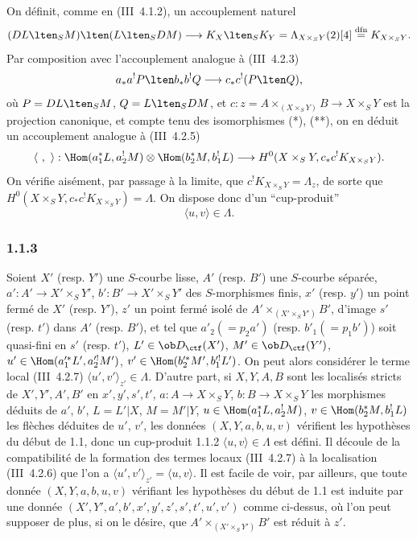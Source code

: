 On définit, comme en (III~4.1.2), un accouplement naturel
\[
(DL\lten_SM)\lten(L\lten_SDM)
\longrightarrow K_X\lten_SK_Y=\Lambda_{X\times_S Y}(2)[4]\stackrel{\mathrm{dfn}}{=}K_{X\times_S Y}.
\]
Par composition avec l'accouplement analogue à (III~4.2.3)
\[
a_*a^!P\lten b_*b^!Q\longrightarrow c_*c^!(P\lten Q),
\]
où $P=DL\lten_SM$, $Q=L\lten_SDM$, et $c:z=A\times_{(X\times_S Y)}B\to X\times_S Y$ est la projection canonique, et compte tenu des isomorphismes (*), (**), on en déduit un accouplement analogue à (III~4.2.5)
\[
\langle\ ,\ \rangle:\Hom(a_1^*L,a_2^!M)\otimes\Hom(b_2^*M,b_1^!L)
\longrightarrow H^0(X\times_S Y,c_*c^!K_{X\times_S Y}).
\]
On vérifie
aisément, par passage à la limite, que $c^!K_{X\times_S Y}=\Lambda_z$, de sorte que $H^0(X\times_S Y,c_*c^!K_{X\times_S Y})=\Lambda$. On dispose donc d'un ``cup-produit''
\begin{equation}\tag{1.1.2}
\langle u,v\rangle\in\Lambda.
\end{equation}

\subsubsection*{1.1.3}
Soient $X'$ (resp. $Y'$) une $S$-courbe lisse, $A'$ (resp. $B'$) une $S$-courbe séparée, $a':A'\longrightarrow X'\times_S Y'$, $b':B'\longrightarrow X'\times_S Y'$ des $S$-morphismes finis, $x'$ (resp. $y'$) un point fermé de $X'$ (resp. $Y'$), $z'$ un point fermé isolé de $A'\times_{(X'\times_S Y')}B'$, d'image $s'$ (resp. $t'$) dans $A'$ (resp. $B'$), et tel que $a'_2(=p_2a')$ (resp. $b'_1(=p_1b')$) soit quasi-fini en $s'$ (resp. $t'$), $L'\in\ob D_{\ctf}(X')$, $M'\in\ob D_{\ctf}(Y')$, $u'\in\Hom(a_1'^*L',a_2'^!M')$, $v'\in\Hom(b_2'^*M',b_1'^!L')$. On peut alors considérer le terme local (III~4.2.7) $\langle u',v'\rangle_{z'}\in\Lambda$. D'autre part, si $X,Y,A,B$ sont les localisés stricts de $X',Y',A',B'$ en $x',y',s',t'$, $a:A\to X\times_S Y$, $b:B\to X\times_SY$ les morphismes déduits de $a'$, $b'$, $L=L'|X$, $M=M'|Y$, $u\in\Hom(a_1^*L,a_2^!M)$, $v\in\Hom(b_2^*M,b_1^!L)$ les flèches déduites de $u'$, $v'$, les données $(X,Y,a,b,u,v)$ vérifient les hypothèses du début de 1.1, donc un cup-produit 1.1.2 $\langle u,v\rangle\in\Lambda$ est défini. Il découle de la compatibilité de la formation des termes locaux (III~4.2.7) à la localisation (III~4.2.6) que l'on a $\langle u',v'\rangle_{z'}=\langle u,v\rangle$. Il est facile de voir, par ailleurs, que toute donnée $(X,Y,a,b,u,v)$ vérifiant les hypothèses du début de 1.1 est induite par une donnée $(X',Y',a',b',x',y',z',s',t',u',v')$ comme ci-dessus, où l'on peut supposer de plus, si on le désire, que $A'\times_{(X'\times_S Y')}B'$ est réduit à $z'$.

